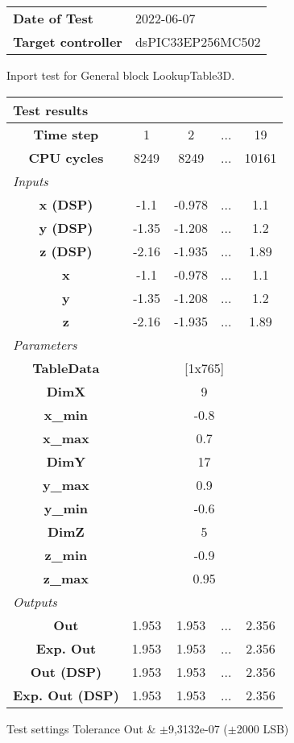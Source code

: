 \begin{tabular}{l l}
\textbf{Date of Test} & 2022-06-07 \tabularnewline
\textbf{Target controller} & dsPIC33EP256MC502 \tabularnewline
\end{tabular}
\vspace{1ex}
Inport test for General block LookupTable3D.

\vspace{1em}
\begin{tabularx}{\textwidth}{|c|c|c|>{\centering\arraybackslash}X|c|}
\hline
\multicolumn{5}{|l|}{\cellcolor[gray]{0.8}\textbf{Test results}} \tabularnewline \hline
\textbf{Time step} & 1 & 2 & ... & 19 \tabularnewline \hline
\textbf{CPU cycles} & 8249 & 8249 & ... & 10161 \tabularnewline \hline
\multicolumn{5}{|l|}{\cellcolor[gray]{0.9}\textit{Inputs}} \tabularnewline \hline
\textbf{x (DSP)} & -1.1 & -0.978 & ... & 1.1 \tabularnewline \hline
\textbf{y (DSP)} & -1.35 & -1.208 & ... & 1.2 \tabularnewline \hline
\textbf{z (DSP)} & -2.16 & -1.935 & ... & 1.89 \tabularnewline \hline
\textbf{x} & -1.1 & -0.978 & ... & 1.1 \tabularnewline \hline
\textbf{y} & -1.35 & -1.208 & ... & 1.2 \tabularnewline \hline
\textbf{z} & -2.16 & -1.935 & ... & 1.89 \tabularnewline \hline
\multicolumn{5}{|l|}{\cellcolor[gray]{0.9}\textit{Parameters}} \tabularnewline \hline
\textbf{TableData} & \multicolumn{4}{c|}{[1x765]} \tabularnewline \hline
\textbf{DimX} & \multicolumn{4}{c|}{9} \tabularnewline \hline
\textbf{x\_min} & \multicolumn{4}{c|}{-0.8} \tabularnewline \hline
\textbf{x\_max} & \multicolumn{4}{c|}{0.7} \tabularnewline \hline
\textbf{DimY} & \multicolumn{4}{c|}{17} \tabularnewline \hline
\textbf{y\_max} & \multicolumn{4}{c|}{0.9} \tabularnewline \hline
\textbf{y\_min} & \multicolumn{4}{c|}{-0.6} \tabularnewline \hline
\textbf{DimZ} & \multicolumn{4}{c|}{5} \tabularnewline \hline
\textbf{z\_min} & \multicolumn{4}{c|}{-0.9} \tabularnewline \hline
\textbf{z\_max} & \multicolumn{4}{c|}{0.95} \tabularnewline \hline
\multicolumn{5}{|l|}{\cellcolor[gray]{0.9}\textit{Outputs}} \tabularnewline \hline
\textbf{Out} & 1.953 & 1.953 & ... & 2.356 \tabularnewline \hline
\textbf{Exp. Out} & 1.953 & 1.953 & ... & 2.356 \tabularnewline \hline
\textbf{Out (DSP)} & 1.953 & 1.953 & ... & 2.356 \tabularnewline \hline
\textbf{Exp. Out (DSP)} & 1.953 & 1.953 & ... & 2.356 \tabularnewline \hline
\end{tabularx}
\vspace{1ex}

\begin{XtoCtabular}{Test settings}
Tolerance Out & $\pm$9,3132e-07 ($\pm$2000 LSB) \tabularnewline \hline
\end{XtoCtabular}

